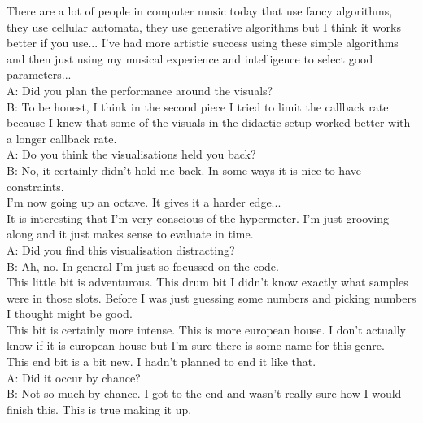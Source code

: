 There are a lot of people in computer music today that use fancy algorithms, they use cellular automata, they use generative algorithms but I think it works better if you use... I've had more artistic success using these simple algorithms and then just using my musical experience and intelligence to select good parameters...\\

A: Did you plan the performance around the visuals?\\

B: To be honest, I think in the second piece I tried to limit the callback rate because I knew that some of the visuals in the didactic setup worked better with a longer callback rate.\\

A: Do you think the visualisations held you back?\\

B: No, it certainly didn't hold me back. In some ways it is nice to have constraints.\\

I'm now going up an octave. It gives it a harder edge...\\

It is interesting that I'm very conscious of the hypermeter. I'm just grooving along and it just makes sense to evaluate in time.\\

A: Did you find this visualisation distracting?\\

B: Ah, no. In general I'm just so focussed on the code.\\

This little bit is adventurous. This drum bit I didn't know exactly what samples were in those slots. Before I was just guessing some numbers and picking numbers I thought might be good.\\

This bit is certainly more intense. This is more european house. I don't actually know if it is european house but I'm sure there is some name for this genre.\\

This end bit is a bit new. I hadn't planned to end it like that.\\

A: Did it occur by chance?\\

B: Not so much by chance. I got to the end and wasn't really sure how I would finish this. This is true making it up.\\

